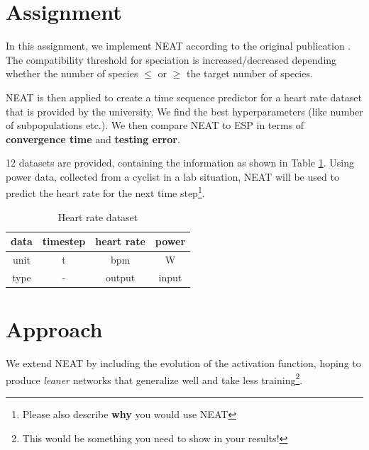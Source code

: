 \documentclass{hbrs-ecta-report}
\begin{document}
\FloatBarrier
\newpage
\newpage
\section{Assignment}
In this assignment, we implement NEAT according to the original publication \cite{Stanley2002a}. The compatibility threshold for speciation is increased/decreased depending whether the number of species $\leq$ or $\geq$ the target number of species.

NEAT is then applied to create a time sequence predictor for a heart rate dataset that is provided by the university. We find the best hyperparameters (like number of subpopulations etc.). We then compare NEAT to ESP in terms of \textbf{convergence time} and \textbf{testing error}.

12 datasets are provided, containing the information as shown in Table \ref{table:heartrate}. Using power data, collected from a cyclist in a lab situation, NEAT will be used to predict the heart rate for the next time step\footnote{Please also describe \textbf{why} you would use NEAT}.

\begin{table}[h!tbp]
\centering                                                                      
\begin{tabular}{c||c|c|c}
data&timestep&heart rate&power\\
\hline
unit&t&bpm&W\\
\hline
type&-&output&input\\
\end{tabular}                                                                   
\caption{Heart rate dataset}
\label{table:heartrate}                                                      
\end{table} 


\FloatBarrier
\section{Approach}

We extend NEAT by including the evolution of the activation function, hoping to produce \textit{leaner} networks that generalize well and take less training\footnote{This would be something you need to show in your results!}. 
\end{document}
